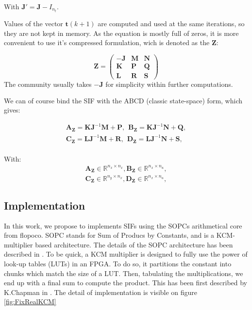 	With $\boldsymbol{J'} = \boldsymbol{J} - I_{n_t}$.

	Values of the vector $\boldsymbol{t}(k+1)$ are computed and used at the same iterations, so they are not kept in memory.
	As the equation is mostly full of zeros, it is more convenient to use it’s compressed formulation, wich is denoted
	as the $\boldsymbol{Z}$:
	
	\begin{equation} \label{zmatrix}
		\boldsymbol{Z}=
		\begin{pmatrix}
			\boldsymbol{-J} & \boldsymbol{M} & \boldsymbol{N} \\
			\boldsymbol{K} & \boldsymbol{P} & \boldsymbol{Q} \\
			\boldsymbol{L} & \boldsymbol{R} & \boldsymbol{S} 
		\end{pmatrix}
	\end{equation}
	The community usually takes $-\boldsymbol{J}$ for simplicity within further computations.

	We can of course bind the SIF with the ABCD (classic state-space) form, which gives:

	\begin{eqnarray} \label{abcdtranspose}
		\boldsymbol{A_Z} = \boldsymbol{KJ}^{-1}\boldsymbol{M} +\boldsymbol{P}, \hspace{5pt}
		\boldsymbol{B_Z} = \boldsymbol{KJ}^{-1}\boldsymbol{N} +\boldsymbol{Q}, \nonumber \\
		\boldsymbol{C_Z} = \boldsymbol{LJ}^{-1}\boldsymbol{M} +\boldsymbol{R}, \hspace{5pt}
		\boldsymbol{D_Z} = \boldsymbol{LJ}^{-1}\boldsymbol{N} +\boldsymbol{S}, \nonumber \\
	\end{eqnarray}

	With:
	\begin{eqnarray}
		\boldsymbol{A_Z} \in \mathbb{R}^{n_x \times n_x},
		\boldsymbol{B_Z} \in \mathbb{R}^{n_x \times n_u}, \nonumber \\
		\boldsymbol{C_Z} \in \mathbb{R}^{n_y \times n_x},
		\boldsymbol{D_Z} \in \mathbb{R}^{n_x \times n_u},
	\end{eqnarray}


	\subsection{Implementation}
	In this work, we propose to implements SIFs using the SOPCs arithmetical core from flopoco.
	SOPC stands for Sum of Producs by Constants, and is a KCM-multiplier based architecture.
	The details of the SOPC architecture has been described in \cite{sums}.
	To be quick, a KCM multiplier is designed to fully use the power of look-up tables (LUTs) in an FPGA.
	To do so, it partitions the constant into chunks which match the size of a LUT.
	Then, tabulating the multiplications, we end up with a final sum to compute the product.
	This has been first described by K.Chapman in \cite{Chapman93:edn}.
	The detail of implementation is visible on figure \ref{fig:FixRealKCM}

